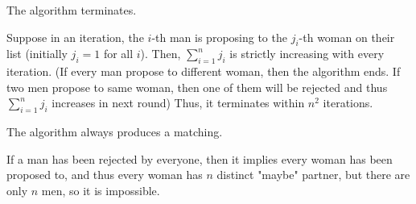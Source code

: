 \begin{claim}
    The algorithm terminates.
\end{claim}
\begin{explanation}
    Suppose in an iteration, the \(i\)-th man is proposing to the \(j_i\)-th woman on their list (initially \(j_i = 1\) for all \(i\)). Then, \(\sum_{i=1}^n j_i \) is strictly increasing with every iteration. (If every man propose to different woman, then the algorithm ends. If two men propose to same woman, then one of them will be rejected and thus \(\sum_{i=1}^n j_i \) increases in next round) Thus, it terminates within \(n^2\) iterations. 
\end{explanation}

\begin{claim}
    The algorithm always produces a matching.
\end{claim}

\begin{explanation}
    If a man has been rejected by everyone, then it implies every woman has been proposed to, and thus every woman has \(n\) distinct "maybe" partner, but there are only \(n\) men, so it is impossible.  
\end{explanation}